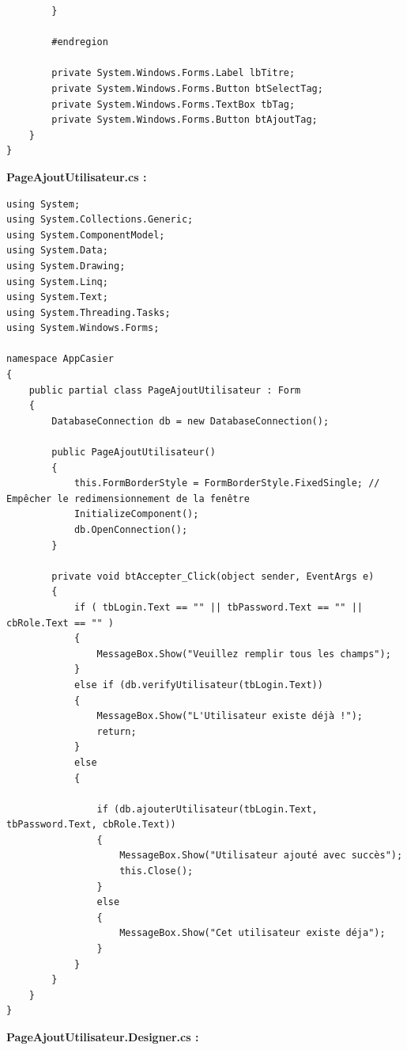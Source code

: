 \documentclass[main.tex]{subfiles}
\begin{document}
\begin{lstlisting}
        }

        #endregion

        private System.Windows.Forms.Label lbTitre;
        private System.Windows.Forms.Button btSelectTag;
        private System.Windows.Forms.TextBox tbTag;
        private System.Windows.Forms.Button btAjoutTag;
    }
}
\end{lstlisting}


\textbf{PageAjoutUtilisateur.cs :}

\begin{lstlisting}
using System;
using System.Collections.Generic;
using System.ComponentModel;
using System.Data;
using System.Drawing;
using System.Linq;
using System.Text;
using System.Threading.Tasks;
using System.Windows.Forms;

namespace AppCasier
{
    public partial class PageAjoutUtilisateur : Form
    {
        DatabaseConnection db = new DatabaseConnection();

        public PageAjoutUtilisateur()
        {
            this.FormBorderStyle = FormBorderStyle.FixedSingle; // Empêcher le redimensionnement de la fenêtre
            InitializeComponent();
            db.OpenConnection();
        }

        private void btAccepter_Click(object sender, EventArgs e)
        {
            if ( tbLogin.Text == "" || tbPassword.Text == "" || cbRole.Text == "" )
            {
                MessageBox.Show("Veuillez remplir tous les champs");
            }
            else if (db.verifyUtilisateur(tbLogin.Text))
            {
                MessageBox.Show("L'Utilisateur existe déjà !");
                return;
            }
            else
            {

                if (db.ajouterUtilisateur(tbLogin.Text, tbPassword.Text, cbRole.Text))
                {
                    MessageBox.Show("Utilisateur ajouté avec succès");
                    this.Close();
                }
                else
                {
                    MessageBox.Show("Cet utilisateur existe déja");
                }
            }
        }
    }
}
\end{lstlisting}

\textbf{PageAjoutUtilisateur.Designer.cs :}
\end{document}
